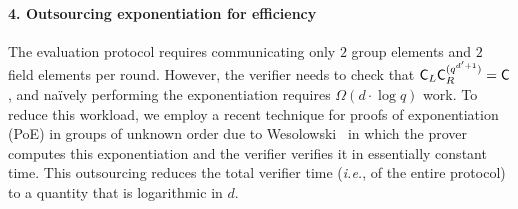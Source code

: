 \paragraph{4. Outsourcing exponentiation for efficiency}
The evaluation protocol requires communicating only $2$ group elements and $2$ field elements per round. However, the verifier needs to check that $\mathsf{C}_L\mathsf{C}_R^{(q^{d'+1})}=\mathsf{C}$, and naïvely performing the exponentiation requires $\Omega(d \cdot \log q)$ work. To reduce this workload, we employ a recent technique for proofs of exponentiation (\textsf{PoE}) in groups of unknown order due to Wesolowski~\cite{EC:Wesolowski19} in which the prover computes this exponentiation and the verifier verifies it in essentially constant time. This outsourcing reduces the total verifier time (\emph{i.e.}, of the entire protocol) to a quantity that is logarithmic in $d$. %

